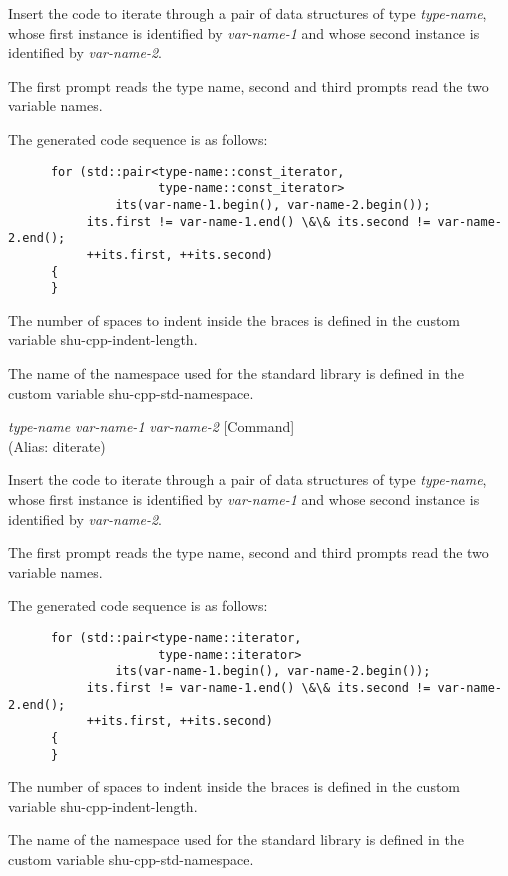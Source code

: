 \begin{doc-string}
Insert the code to iterate through a pair of data structures of type
\emph{type-name}, whose first instance is identified by \emph{var-name-1} and whose second
instance is identified by \emph{var-name-2}.

The first prompt reads the type name, second and third prompts read the two
variable names.

The generated code sequence is as follows:

\small{\begin{verbatim}
      for (std::pair<type-name::const_iterator,
                     type-name::const_iterator>
               its(var-name-1.begin(), var-name-2.begin());
           its.first != var-name-1.end() \&\& its.second != var-name-2.end();
           ++its.first, ++its.second)
      {
      }
\end{verbatim}}

The number of spaces to indent inside the braces is defined in the custom
variable shu-cpp-indent-length.

The name of the namespace used for the standard library is defined in the custom
variable shu-cpp-std-namespace.
\end{doc-string}

\vspace{1em}
\noindent
{}
\usebox{\funcname}\emph{type-name} \emph{var-name-1} \emph{var-name-2}
 \hfill [Command]\\%
 (Alias: diterate)

\begin{doc-string}
Insert the code to iterate through a pair of data structures of type
\emph{type-name}, whose first instance is identified by \emph{var-name-1} and whose second
instance is identified by \emph{var-name-2}.

The first prompt reads the type name, second and third prompts read the two
variable names.

The generated code sequence is as follows:

\small{\begin{verbatim}
      for (std::pair<type-name::iterator,
                     type-name::iterator>
               its(var-name-1.begin(), var-name-2.begin());
           its.first != var-name-1.end() \&\& its.second != var-name-2.end();
           ++its.first, ++its.second)
      {
      }
\end{verbatim}}

The number of spaces to indent inside the braces is defined in the custom
variable shu-cpp-indent-length.

The name of the namespace used for the standard library is defined in the custom
variable shu-cpp-std-namespace.
\end{doc-string}

